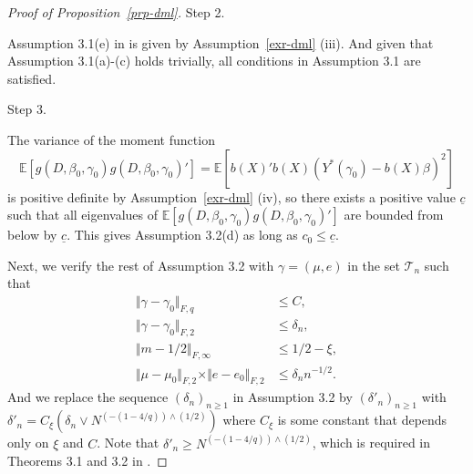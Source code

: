 \documentclass[
  12pt,
  12pt]{article}
\numberwithin{equation}{section}
\theoremstyle{definition}
\theoremstyle{plain}
\theoremstyle{plain}
\theoremstyle{remark}
\begin{document}
\begin{proof}[Proof of Proposition~\ref{prp-dml}]
Step 2.

Assumption 3.1(e) in \citet{chernozhukov2018double} is given by
Assumption~\ref{exr-dml} (iii). And given that Assumption 3.1(a)-(c)
holds trivially, all conditions in Assumption 3.1 are satisfied.

Step 3.

The variance of the moment function \[
\mathbb{E}[g(D, \beta_0, \gamma_0)g(D, \beta_0, \gamma_0)'] = \mathbb{E}[b(X)'b(X)(Y^*(\gamma_0) - b(X)\beta)^2]
\] is positive definite by Assumption~\ref{exr-dml} (iv), so there
exists a positive value \(\underline{c}\) such that all eigenvalues of
\(\mathbb{E}[g(D, \beta_0, \gamma_0)g(D, \beta_0, \gamma_0)']\) are
bounded from below by \(\underline{c}\). This gives Assumption 3.2(d) as
long as \(c_0 \leqslant \underline{c}\).

Next, we verify the rest of Assumption 3.2 with \(\gamma = (\mu, e)\) in
the set \(\mathcal{T}_n\) such that \[
\begin{aligned}
\Vert \gamma - \gamma_0 \Vert_{F, q} &\leqslant C, \\
\Vert \gamma - \gamma_0 \Vert_{F, 2} &\leqslant \delta_n, \\
\Vert m - 1/2 \Vert_{F, \infty} &\leqslant 1/2 - \xi, \\
\Vert \mu - \mu_0 \Vert_{F, 2} \times \Vert e - e_0 \Vert_{F, 2} &\leqslant \delta_n n^{-1/2}.
\end{aligned}
\] And we replace the sequence \((\delta_n)_{n \geqslant 1}\) in
Assumption 3.2 by \((\delta'_n)_{n \geqslant 1}\) with
\(\delta'_n = C_\xi(\delta_n \vee N^{(-(1 - 4/q))\wedge(1/2)})\) where
\(C_\xi\) is some constant that depends only on \(\xi\) and \(C\). Note
that \(\delta'_n \geqslant N^{(-(1 - 4/q))\wedge(1/2)}\), which is
required in Theorems 3.1 and 3.2 in \citet{chernozhukov2018double}.


\end{proof}
\end{document}
